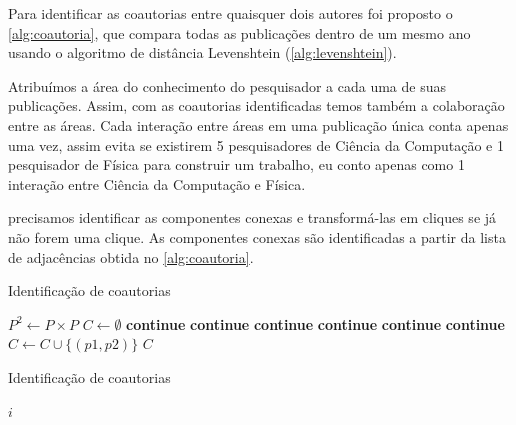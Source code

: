 Para identificar as coautorias entre quaisquer dois autores foi proposto o \autoref{alg:coautoria}, que compara todas as publicações dentro de um mesmo ano usando o algoritmo de distância Levenshtein (\autoref{alg:levenshtein}).

Atribuímos a área do conhecimento do pesquisador a cada uma de suas publicações. Assim, com as coautorias identificadas temos também a colaboração entre as áreas. Cada interação entre áreas em uma publicação única conta apenas uma vez, assim evita se existirem 5 pesquisadores de Ciência da Computação e 1 pesquisador de Física para construir um trabalho, eu conto apenas como 1 interação entre Ciência da Computação e Física.



precisamos identificar as componentes conexas e transformá-las em cliques se já não forem uma clique. As componentes conexas são identificadas a partir da lista de adjacências obtida no \autoref{alg:coautoria}.

\begin{algorithm}
  \caption{Identificação de coautorias}
  \label{alg:coautoria}
  \begin{algorithmic}[1]
    \State $P^2\gets P\times{P}$
    \State $C\gets \emptyset$
      \State \textbf{continue}
      \State \textbf{continue}
      \State \textbf{continue}
      \State \textbf{continue}
      \State \textbf{continue}
      \State \textbf{continue}
    \Else
      \State $C\gets C\cup\{(p1, p2)\}$
    \EndIf
    \EndFor
    \State \Return $C$
  \EndProcedure
  \end{algorithmic}
\end{algorithm}

\begin{algorithm}
\caption{Identificação de coautorias}
\label{alg:levenshtein}
\begin{algorithmic}[1]
\State \Return $i$
\EndProcedure
\end{algorithmic}
\end{algorithm}


